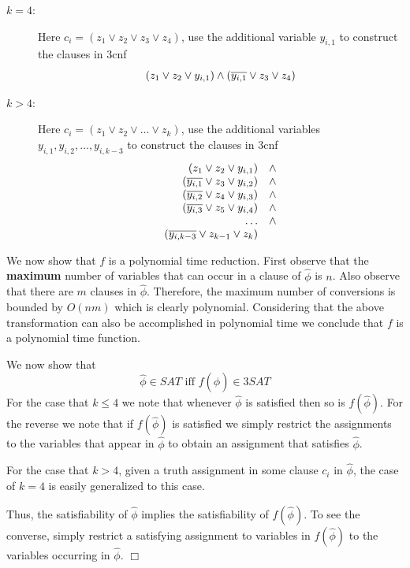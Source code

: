 \documentclass[a4paper,blends,pdf,colorBG,slideColor]{prosper}
\begin{document}
{\small
\begin{description}
\item[$k = 4$:] Here $c_i = (z_1 \vee z_2 \vee z_3 \vee z_4)$, use the additional variable $y_{i,1}$ to construct the clauses in 3cnf
\[
(z_1 \vee z_2 \vee y_{i,1})\wedge(\overline{y_{i,1}} \vee z_3 \vee z_4)
\]

\item[$k > 4$:] Here $c_i = (z_1 \vee z_2 \vee \ldots \vee z_k)$, use the additional variables $y_{i,1}, y_{i,2}, \ldots, y_{i, k-3}$ to construct the clauses in 3cnf
\[
\begin{array}{rc}
(z_1 \vee z_2 \vee y_{i,1})& \wedge\\
(\overline{y_{i,1}} \vee z_3 \vee {y_{i,2}})& \wedge\\
(\overline{y_{i,2}} \vee z_4 \vee {y_{i,3}}) &\wedge\\
(\overline{y_{i,3}} \vee z_5 \vee {y_{i,4}})& \wedge\\
\ldots &\wedge \\
(\overline{y_{i,k-3}} \vee z_{k-1} \vee z_k)&
\end{array}
\]
\end{description}
We now show that $f$ is a polynomial time reduction.  First observe that the {\bf maximum} number of variables that can occur in a clause of $\hat{\phi}$ is $n$.  Also observe
that there are $m$ clauses in $\hat{\phi}$.  Therefore, the maximum number 
of conversions is bounded by $O(nm)$ which is clearly polynomial.  Considering that the
above transformation can also be accomplished in polynomial time we conclude
that $f$ is a polynomial time function.


}
\es

{\small
We now show that 
\[
\hat{\phi} \in SAT \mbox{ iff } f(\hat{\phi}) \in 3SAT
\]
For the case that $k \le 4$ we note that whenever $\hat{\phi}$ is satisfied then so is
$f(\hat{\phi})$.  For the reverse we note that if $f(\hat{\phi})$ is satisfied we simply
restrict the assignments to the variables that appear in $\hat{\phi}$ to obtain
an assignment that satisfies $\hat{\phi}$.

For the case that $k > 4$, given a truth assignment in some clause $c_i$ in $\hat{\phi}$, the
case of $k = 4$ is easily generalized to this case.


Thus, the satisfiability of $\hat{\phi}$ implies the satisfiability of $f(\hat{\phi})$.
To see the converse, simply restrict a satisfying assignment to variables in $f(\hat{\phi})$
to the variables occurring in $\hat{\phi}$. $\Box$
}
\es
\end{document}
